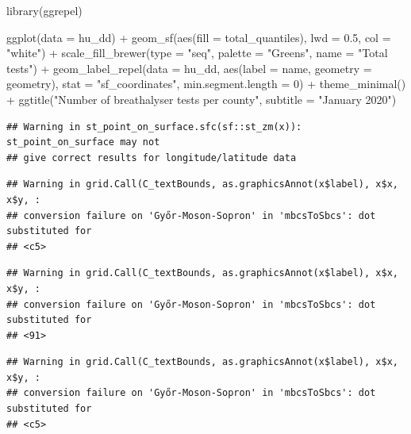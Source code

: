 \documentclass[
]{book}
\newenvironment{Shaded}{\begin{snugshade}}{\end{snugshade}}
\newcommand{\AttributeTok}[1]{\textcolor[rgb]{0.77,0.63,0.00}{#1}}
\newcommand{\DecValTok}[1]{\textcolor[rgb]{0.00,0.00,0.81}{#1}}
\newcommand{\FloatTok}[1]{\textcolor[rgb]{0.00,0.00,0.81}{#1}}
\newcommand{\FunctionTok}[1]{\textcolor[rgb]{0.00,0.00,0.00}{#1}}
\newcommand{\NormalTok}[1]{#1}
\newcommand{\SpecialCharTok}[1]{\textcolor[rgb]{0.00,0.00,0.00}{#1}}
\newcommand{\StringTok}[1]{\textcolor[rgb]{0.31,0.60,0.02}{#1}}
\begin{document}
\begin{Shaded}
\begin{Highlighting}[]
\FunctionTok{library}\NormalTok{(ggrepel)}

\FunctionTok{ggplot}\NormalTok{(}\AttributeTok{data =}\NormalTok{ hu\_dd) }\SpecialCharTok{+} 
  \FunctionTok{geom\_sf}\NormalTok{(}\FunctionTok{aes}\NormalTok{(}\AttributeTok{fill =}\NormalTok{ total\_quantiles), }\AttributeTok{lwd =} \FloatTok{0.5}\NormalTok{, }\AttributeTok{col =} \StringTok{"white"}\NormalTok{) }\SpecialCharTok{+} 
  \FunctionTok{scale\_fill\_brewer}\NormalTok{(}\AttributeTok{type =} \StringTok{"seq"}\NormalTok{, }\AttributeTok{palette =} \StringTok{"Greens"}\NormalTok{, }\AttributeTok{name =} \StringTok{"Total tests"}\NormalTok{) }\SpecialCharTok{+} 
  \FunctionTok{geom\_label\_repel}\NormalTok{(}\AttributeTok{data =}\NormalTok{ hu\_dd, }\FunctionTok{aes}\NormalTok{(}\AttributeTok{label =}\NormalTok{ name, }\AttributeTok{geometry =}\NormalTok{ geometry), }\AttributeTok{stat =} \StringTok{"sf\_coordinates"}\NormalTok{, }\AttributeTok{min.segment.length =} \DecValTok{0}\NormalTok{) }\SpecialCharTok{+} 
  \FunctionTok{theme\_minimal}\NormalTok{() }\SpecialCharTok{+} 
  \FunctionTok{ggtitle}\NormalTok{(}\StringTok{"Number of breathalyser tests per county"}\NormalTok{, }\AttributeTok{subtitle =} \StringTok{"January 2020"}\NormalTok{) }
\end{Highlighting}
\end{Shaded}

\begin{verbatim}
## Warning in st_point_on_surface.sfc(sf::st_zm(x)): st_point_on_surface may not
## give correct results for longitude/latitude data
\end{verbatim}

\begin{verbatim}
## Warning in grid.Call(C_textBounds, as.graphicsAnnot(x$label), x$x, x$y, :
## conversion failure on 'Győr-Moson-Sopron' in 'mbcsToSbcs': dot substituted for
## <c5>
\end{verbatim}

\begin{verbatim}
## Warning in grid.Call(C_textBounds, as.graphicsAnnot(x$label), x$x, x$y, :
## conversion failure on 'Győr-Moson-Sopron' in 'mbcsToSbcs': dot substituted for
## <91>
\end{verbatim}

\begin{verbatim}
## Warning in grid.Call(C_textBounds, as.graphicsAnnot(x$label), x$x, x$y, :
## conversion failure on 'Győr-Moson-Sopron' in 'mbcsToSbcs': dot substituted for
## <c5>
\end{verbatim}
\end{document}
